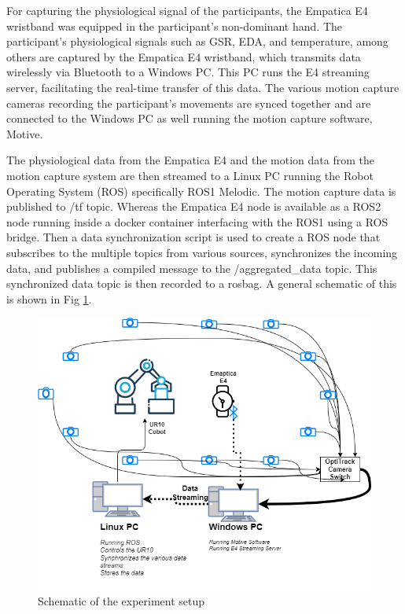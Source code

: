 For capturing the physiological signal of the participants, the Empatica E4 wristband was equipped in the participant's non-dominant hand. The participant's physiological signals such as \gls{GSR}, \gls{EDA},  and temperature, among others are captured by the Empatica E4 wristband, which transmits data wirelessly via Bluetooth to a Windows PC. This PC runs the E4 streaming server, facilitating the real-time transfer of this data. The various motion capture cameras recording the participant's movements are synced  together and are connected to the Windows PC as well running the motion capture software, Motive. 

The physiological data from the Empatica E4 and the motion data from the motion capture system are then streamed to a Linux PC running the Robot Operating System (ROS) specifically ROS1 Melodic.
The motion capture data is published to /tf topic. Whereas the Empatica E4 node is available as a ROS2 node running inside a docker container interfacing with the ROS1 using a ROS bridge.
Then a data synchronization script is used to create a ROS node that subscribes to the multiple topics from various sources, synchronizes the incoming data, and publishes a compiled message to the /aggregated\_data topic.
This synchronized data topic is then recorded to a rosbag. A general schematic of this is shown in Fig \ref{fig:netwrok}.


\begin{figure}[h]
	\centering
	\includegraphics[width=0.8\columnwidth]{images/network2.png}
	\caption{Schematic of the experiment setup}
	\label{fig:netwrok}
\end{figure}




